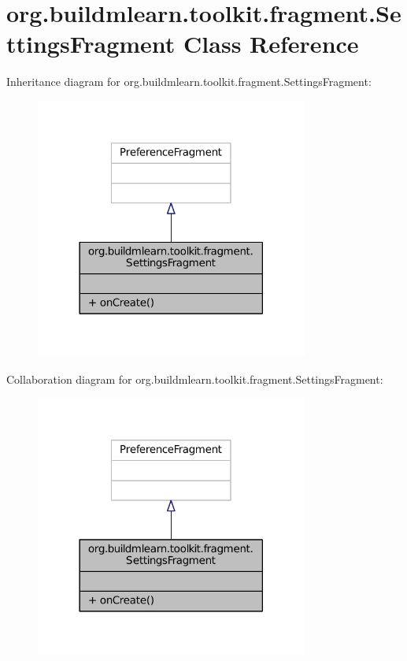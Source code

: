 \hypertarget{classorg_1_1buildmlearn_1_1toolkit_1_1fragment_1_1SettingsFragment}{\section{org.\-buildmlearn.\-toolkit.\-fragment.\-Settings\-Fragment Class Reference}
\label{classorg_1_1buildmlearn_1_1toolkit_1_1fragment_1_1SettingsFragment}
}


Inheritance diagram for org.\-buildmlearn.\-toolkit.\-fragment.\-Settings\-Fragment\-:
\nopagebreak
\begin{figure}[H]
\begin{center}
\leavevmode
\includegraphics[width=254pt]{df/d31/classorg_1_1buildmlearn_1_1toolkit_1_1fragment_1_1SettingsFragment__inherit__graph}
\end{center}
\end{figure}


Collaboration diagram for org.\-buildmlearn.\-toolkit.\-fragment.\-Settings\-Fragment\-:
\nopagebreak
\begin{figure}[H]
\begin{center}
\leavevmode
\includegraphics[width=254pt]{d6/d1a/classorg_1_1buildmlearn_1_1toolkit_1_1fragment_1_1SettingsFragment__coll__graph}
\end{center}
\end{figure}
